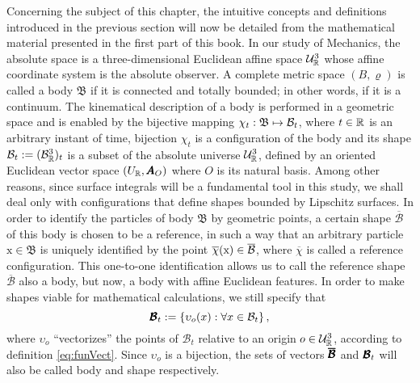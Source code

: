 Concerning the subject of this chapter, the intuitive concepts and definitions introduced in the previous section will now be detailed from the mathematical material presented in the first part of this book. In our study of Mechanics, the absolute space is a three-dimensional Euclidean affine space $\eamd{U}{R}{3}$ whose affine coordinate system is the absolute observer. A complete metric space $(B,\varrho)$ is called a body $\mathfrak{B}$ if it is connected and totally bounded; in other words, if it is a continuum. The kinematical description of a body is performed in a geometric space and is enabled by the bijective mapping $\map{\chi_t}{\mathfrak{B}}{\mathcal{B}_t}$, where $t\in\real$ is an arbitrary instant of time, bijection $\chi_t$ is a configuration of the body and its shape $\mathcal{B}_t:=(\eamd{B}{R}{3})_t$ is a subset of the absolute universe $\eamd{U}{R}{3}$, defined by an oriented Euclidean vector space $(U_\real,\tnr{A}_O)$ where $O$ is its natural basis. Among other reasons, since surface integrals will be a fundamental tool in this study, we shall deal only with configurations that define shapes bounded by Lipschitz surfaces. In order to identify the particles of body $\mathfrak{B}$ by geometric points, a certain shape $\overline{\mathcal{B}}$ of this body is chosen to be a reference, in such a way that an arbitrary particle $\text{x}\in\mathfrak{B}$ is uniquely identified by the point $\fua{\overline{\chi}}{\text{x}}\in\overline{\mathcal{B}}$, where $\overline{\chi}$ is called a reference configuration. This one-to-one identification allows us to call the reference shape $\overline{\mathcal{B}}$ also a body, but now, a body with affine Euclidean features. In order to make shapes viable for mathematical calculations, we still specify that
\begin{equation}
\tnr{\mathcal{B}}_t:=\{\fua{\upsilon_o}{x}:\forall x\in\mathcal{B}_t\}\,,
\end{equation}
where $\upsilon_o$ ``vectorizes'' the points of $\mathcal{B}_t$ relative to an origin $o\in\eamd{U}{R}{3}$, according to definition \eqref{eq:funVect}. Since $\upsilon_o$ is a bijection, the sets of vectors $\tnr{\overline{\mathcal{B}}}$ and $\tnr{\mathcal{B}}_t$ will also be called body and shape respectively.

